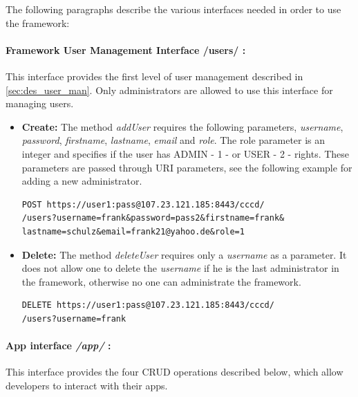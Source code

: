 The following paragraphs describe the various interfaces needed in order to use the framework:

\paragraph{Framework User Management Interface /users/ :} This interface provides the first level of user management described in \ref{sec:des_user_man}. Only administrators are allowed to use this interface for managing users.

\begin{itemize}
\item \textbf{Create:} The method \textit{addUser} requires the following parameters, \textit{username}, \textit{password}, \textit{firstname}, \textit{lastname}, \textit{email} and \textit{role}.  The role parameter is an integer and specifies if the user has ADMIN - 1 - or USER - 2 - rights. These parameters are passed through \ac{URI} parameters, see the following example for adding a new administrator.

\begin{code}
\begin{verbatim}
POST https://user1:pass@107.23.121.185:8443/cccd/
/users?username=frank&password=pass2&firstname=frank&
lastname=schulz&email=frank21@yahoo.de&role=1
\end{verbatim}
\end{code}

\item \textbf{Delete:} The method \textit{deleteUser} requires only a \textit{username} as a parameter. It does not allow one to delete the \textit{username} if he is the last administrator in the framework, otherwise no one can administrate the framework.

\begin{code}
\begin{verbatim}
DELETE https://user1:pass@107.23.121.185:8443/cccd/
/users?username=frank
\end{verbatim}
\end{code}

\end{itemize}


\paragraph{App interface \textit{/app/} :} This interface provides the four \ac{CRUD} operations described below, which allow developers to interact with their apps.

